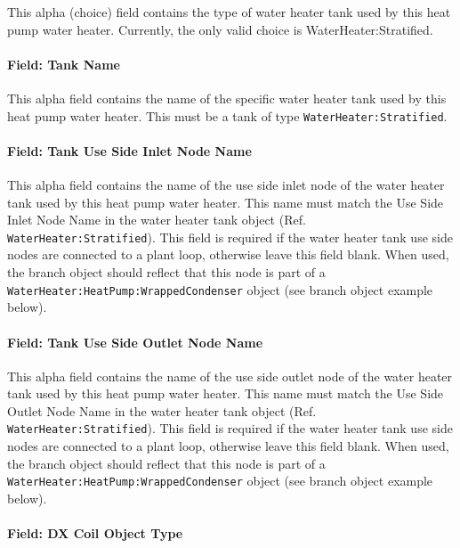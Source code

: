 This alpha (choice) field contains the type of water heater tank used by this heat pump water heater. Currently, the only valid choice is WaterHeater:Stratified.

\paragraph{Field: Tank Name}\label{field-tank-name-1}

This alpha field contains the name of the specific water heater tank used by this heat pump water heater. This must be a tank of type \lstinline!WaterHeater:Stratified!.

\paragraph{Field: Tank Use Side Inlet Node Name}\label{field-tank-use-side-inlet-node-name-1}

This alpha field contains the name of the use side inlet node of the water heater tank used by this heat pump water heater. This name must match the Use Side Inlet Node Name in the water heater tank object (Ref. \lstinline!WaterHeater:Stratified!). This field is required if the water heater tank use side nodes are connected to a plant loop, otherwise leave this field blank. When used, the branch object should reflect that this node is part of a \lstinline!WaterHeater:HeatPump:WrappedCondenser! object (see branch object example below).

\paragraph{Field: Tank Use Side Outlet Node Name}\label{field-tank-use-side-outlet-node-name-1}

This alpha field contains the name of the use side outlet node of the water heater tank used by this heat pump water heater. This name must match the Use Side Outlet Node Name in the water heater tank object (Ref. \lstinline!WaterHeater:Stratified!). This field is required if the water heater tank use side nodes are connected to a plant loop, otherwise leave this field blank. When used, the branch object should reflect that this node is part of a \lstinline!WaterHeater:HeatPump:WrappedCondenser! object (see branch object example below).

\paragraph{Field: DX Coil Object Type}\label{field-dx-coil-object-type-1}

